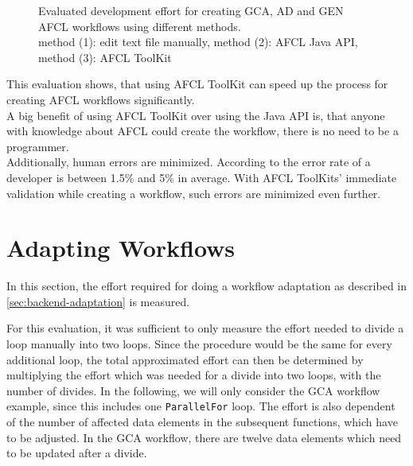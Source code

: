 \documentclass[a4paper,top=25mm,bottom=25mm,12pt,pdftex,halfparskip,twoside,bibtotoc,numbers=noenddot]{scrbook}
\begin{document}
\begin{figure}[h]
\caption{Evaluated development effort for creating GCA, AD and GEN AFCL workflows using different methods.\\ \small{method (1): edit text file manually, method (2): AFCL Java API, method (3): AFCL ToolKit}}
\label{fig:evaluation-composing}
\end{figure}

This evaluation shows, that using AFCL ToolKit can speed up the process for creating AFCL workflows significantly.\\
A big benefit of using AFCL ToolKit over using the Java API is, that anyone with knowledge about AFCL could create the workflow, there is no need to be a programmer.\\
Additionally, human errors are minimized. According to \cite{books-code-complete-mcconnell} the error rate of a developer is between 1.5\% and 5\% in average.
With AFCL ToolKits' immediate validation while creating a workflow, such errors are minimized even further. 

\section{Adapting Workflows}
\label{sec:evaluation-adapting}


In this section, the effort required for doing a workflow adaptation as described in \ref{sec:backend-adaptation} is measured.

For this evaluation, it was sufficient to only measure the effort needed to divide a loop manually into two loops. Since the procedure would be the same for every additional loop, the total approximated effort can then be determined by multiplying the effort which was needed for a divide into two loops, with the number of divides.
In the following, we will only consider the GCA workflow example, since this includes one \texttt{ParallelFor} loop.
The effort is also dependent of the number of affected data elements in the subsequent functions, which have to be adjusted. In the GCA workflow, there are twelve data elements which need to be updated after a divide.
\end{document}
